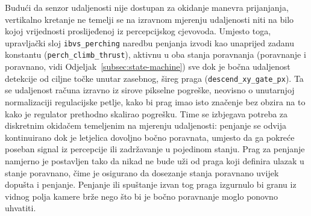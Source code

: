 Budući da senzor udaljenosti nije dostupan za okidanje manevra prijanjanja, vertikalno kretanje ne temelji se na izravnom mjerenju udaljenosti niti na bilo kojoj vrijednosti proslijeđenoj iz percepcijskog cjevovoda. Umjesto toga, upravljački sloj \texttt{ibvs\_perching} naredbu penjanja izvodi kao unaprijed zadanu konstantu (\texttt{perch\_climb\_thrust}), aktivnu u oba stanja poravnanja (poravnanje i poravnano, vidi Odjeljak~\ref{subsec:state-machine}) sve dok je bočna udaljenost detekcije od ciljne točke unutar zasebnog, šireg praga (\texttt{descend\_xy\_gate\_px}). Ta se udaljenost računa izravno iz sirove pikselne pogreške, neovisno o unutarnjoj normalizaciji regulacijske petlje, kako bi prag imao isto značenje bez obzira na to kako je regulator prethodno skalirao pogrešku. Time se izbjegava potreba za diskretnim okidačem temeljenim na mjerenju udaljenosti: penjanje se odvija kontinuirano dok je letjelica dovoljno bočno poravnata, umjesto da ga pokreće poseban signal iz percepcije ili zadržavanje u pojedinom stanju. Prag za penjanje namjerno je postavljen tako da nikad ne bude uži od praga koji definira ulazak u stanje poravnano, čime je osigurano da dosezanje stanja poravnano uvijek dopušta i penjanje. Penjanje ili spuštanje izvan tog praga izgurnulo bi granu iz vidnog polja kamere brže nego što bi je bočno poravnanje moglo ponovno uhvatiti.
